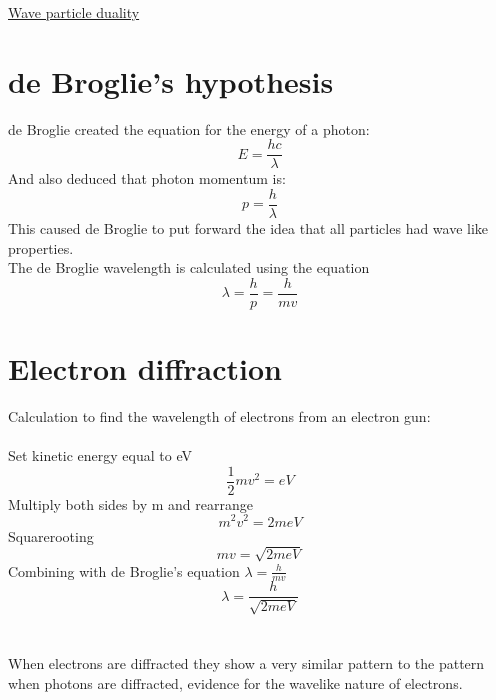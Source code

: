 \documentclass[12pt]{article}
\begin{document}
\begin{center}
\underline{\huge Wave particle duality}
\end{center}
\section{de Broglie's hypothesis}
de Broglie created the equation for the energy of a photon:
$$E=\frac{hc}{\lambda}$$
And also deduced that photon momentum is:
$$p=\frac{h}{\lambda}$$
This caused de Broglie to put forward the idea that all particles had wave like properties.\\
The de Broglie wavelength is calculated using the equation
$$\lambda=\frac{h}{p}=\frac{h}{mv}$$
\section{Electron diffraction}
Calculation to find the wavelength of electrons from an electron gun:\\
\\
Set kinetic energy equal to eV
$$\frac{1}{2}mv^2=eV$$
Multiply both sides by m and rearrange
$$m^2v^2=2meV$$
Squarerooting
$$mv=\sqrt{2meV}$$
Combining with de Broglie's equation $\lambda=\frac{h}{mv}$
$$\lambda=\frac{h}{\sqrt{2meV}}$$
\\
\\
When electrons are diffracted they show a very similar pattern to the pattern when photons are diffracted, evidence for the wavelike nature of electrons.
\end{document}
